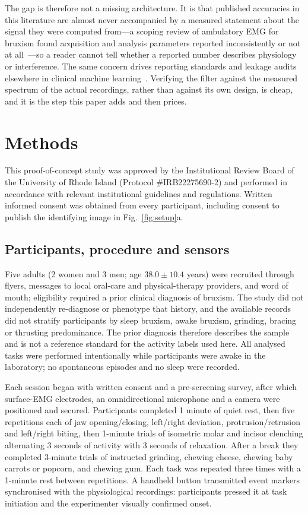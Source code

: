 \documentclass[pdflatex,sn-nature,iicol]{sn-jnl}
\begin{document}
The gap is therefore not a missing architecture. It is that published accuracies in this literature are almost never accompanied by a measured statement about the signal they were computed from---a scoping review of ambulatory EMG for bruxism found acquisition and analysis parameters reported inconsistently or not at all~\cite{thymi2021signal}---so a reader cannot tell whether a reported number describes physiology or interference. The same concern drives reporting standards and leakage audits elsewhere in clinical machine learning~\cite{collins2024tripod,kapoor2023leakage,varoquaux2022machine,pineau2021improving}. Verifying the filter against the measured spectrum of the actual recordings, rather than against its own design, is cheap, and it is the step this paper adds and then prices.

\section{Methods}

This proof-of-concept study was approved by the Institutional Review Board of the University of Rhode Island (Protocol \#IRB22275690-2) and performed in accordance with relevant institutional guidelines and regulations. Written informed consent was obtained from every participant, including consent to publish the identifying image in Fig.~\ref{fig:setup}a.

\subsection{Participants, procedure and sensors}

Five adults (2 women and 3 men; age $38.0 \pm 10.4$ years) were recruited through flyers, messages to local oral-care and physical-therapy providers, and word of mouth; eligibility required a prior clinical diagnosis of bruxism. The study did not independently re-diagnose or phenotype that history, and the available records did not stratify participants by sleep bruxism, awake bruxism, grinding, bracing or thrusting predominance. The prior diagnosis therefore describes the sample and is not a reference standard for the activity labels used here. All analysed tasks were performed intentionally while participants were awake in the laboratory; no spontaneous episodes and no sleep were recorded.

Each session began with written consent and a pre-screening survey, after which surface-EMG electrodes, an omnidirectional microphone and a camera were positioned and secured. Participants completed 1 minute of quiet rest, then five repetitions each of jaw opening/closing, left/right deviation, protrusion/retrusion and left/right biting, then 1-minute trials of isometric molar and incisor clenching alternating 3 seconds of activity with 3 seconds of relaxation. After a break they completed 3-minute trials of instructed grinding, chewing cheese, chewing baby carrots or popcorn, and chewing gum. Each task was repeated three times with a 1-minute rest between repetitions. A handheld button transmitted event markers synchronised with the physiological recordings: participants pressed it at task initiation and the experimenter visually confirmed onset.
\end{document}
